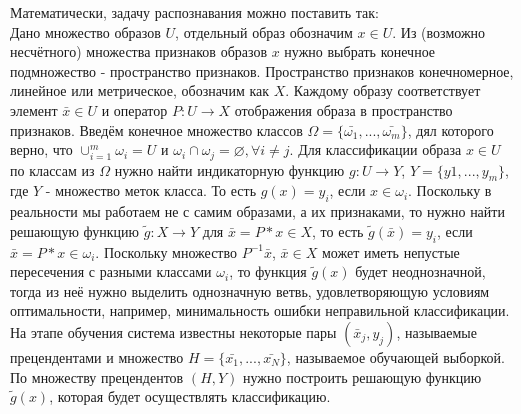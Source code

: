 \documentclass[12pt,a4paper]{article}
\begin{document}
Математически, задачу распознавания можно поставить так: \\
Дано множество образов $U$, отдельный образ обозначим $x \in U$. Из (возможно несчётного) множества признаков образов $x$ нужно выбрать конечное подмножество - пространство признаков. Пространство признаков конечномерное, линейное или метрическое, обозначим как $X$. Каждому образу соответствует элемент $\bar{x} \in U$ и оператор $P: U \longrightarrow X$ отображения образа в пространство признаков. Введём конечное множество классов $\Omega=\{\bar{\omega_1}, ..., \bar{\omega_m}\}$, дял которого верно, что $\cup_{i=1}^m\omega_i = U$ и $\omega_i \cap \omega_j = \varnothing, \forall i \not= j$. Для классификации образа $x \in U$ по классам из $\Omega$ нужно найти индикаторную функцию $g: U \longrightarrow Y$, $Y=\{y1, ..., y_m\}$, где $Y$ - множество меток класса. То есть $g(x)=y_i$, если $x \in \omega_i$. Поскольку в реальности мы работаем не с самим образами, а их признаками, то нужно найти решающую функцию $\tilde{g}: X \longrightarrow Y$ для $\bar{x}=P*x \in X$, то есть $\tilde{g}(\bar{x})=y_i$, если $\bar{x}=P*x \in \omega_i$. Поскольку множество $P^{-1}\bar{x}$, $\bar{x} \in X$ может иметь непустые пересечения с разными классами $\omega_i$, то функция $\tilde{g}(x)$ будет неоднозначной, тогда из неё нужно выделить однозначную ветвь, удовлетворяющую условиям оптимальности, например, минимальность ошибки неправильной классификации. На этапе обучения система известны некоторые пары $(\bar{x}_j, y_j)$, называемые прецендентами и множество $H = \{\bar{x_1}, ...,\bar{x_N}\}$, называемое обучающей выборкой. По множеству прецендентов $(H, Y)$ нужно построить решающую функцию $\tilde{g}(x)$, которая будет осуществлять классификацию.
\end{document}
